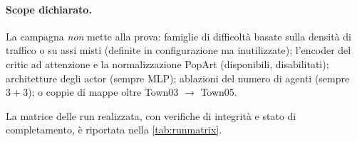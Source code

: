 \paragraph{Scope dichiarato.}
La campagna \emph{non} mette alla prova: famiglie di difficoltà basate
sulla densità di traffico o su assi misti (definite in configurazione ma
inutilizzate); l'encoder del critic ad attenzione e la normalizzazione
PopArt (disponibili, disabilitati); architetture degli actor (sempre
MLP); ablazioni del numero di agenti (sempre $3+3$); o coppie di mappe
oltre Town03 $\to$ Town05.

La matrice delle run realizzata, con verifiche di integrità e stato di
completamento, è riportata nella \cref{tab:runmatrix}.
